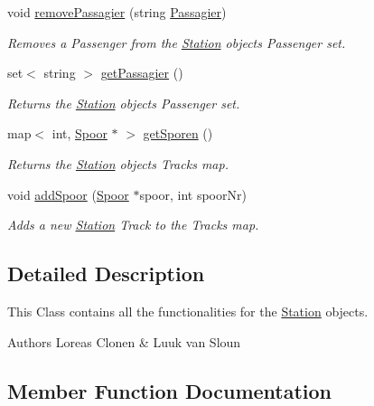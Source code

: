 \begin{DoxyCompactItemize}
void \hyperlink{classStation_aa250b3ba3e62c3d433b4c29f6cca38d4}{remove\+Passagier} (string \hyperlink{classPassagier}{Passagier})
\begin{DoxyCompactList}\small\item\em Removes a Passenger from the \hyperlink{classStation}{Station} object\textquotesingle{}s Passenger set. \end{DoxyCompactList}\item 
set$<$ string $>$ \hyperlink{classStation_a3c25e627a9036778a4d6d08ca1454aa6}{get\+Passagier} ()
\begin{DoxyCompactList}\small\item\em Returns the \hyperlink{classStation}{Station} object\textquotesingle{}s Passenger set. \end{DoxyCompactList}\item 
map$<$ int, \hyperlink{classSpoor}{Spoor} $\ast$ $>$ \hyperlink{classStation_a8ee617b13d4d67d0d3d1384d6d33226f}{get\+Sporen} ()
\begin{DoxyCompactList}\small\item\em Returns the \hyperlink{classStation}{Station} object\textquotesingle{}s Tracks map. \end{DoxyCompactList}\item 
void \hyperlink{classStation_a55911b5e0a355f085afd75391827729f}{add\+Spoor} (\hyperlink{classSpoor}{Spoor} $\ast$spoor, int spoor\+Nr)
\begin{DoxyCompactList}\small\item\em Adds a new \hyperlink{classStation}{Station} Track to the Tracks map. \end{DoxyCompactList}\end{DoxyCompactItemize}


\subsection{Detailed Description}
This Class contains all the functionalities for the \hyperlink{classStation}{Station} objects. 

\begin{DoxyAuthor}{Authors}
Loreas Clonen \& Luuk van Sloun 
\end{DoxyAuthor}


\subsection{Member Function Documentation}
